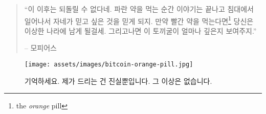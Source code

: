 \begin{quotation}\begin{samepage}
\enquote{이 이후는 되돌릴 수 없다네. 파란 약을 먹는 순간 이야기는 끝나고 침대에서 일어나서 자네가 믿고 싶은 것을 믿게 되지.
	만약 빨간 약을 먹는다면\footnote{the \textit{orange} pill} 당신은 이상한 나라에 남게 될걸세. 
	그리고나면 이 토끼굴이 얼마나 깊은지 보여주지.}
\begin{flushright} -- 모피어스
\end{flushright}\end{samepage}\end{quotation}
	
\begin{figure}
\texttt{[image: assets/images/bitcoin-orange-pill.jpg]}
\caption*{기억하세요. 제가 드리는 건 진실뿐입니다. 그 이상은 없습니다.}
\label{fig:bitcoin-orange-pill}
\end{figure}

%
%
%
